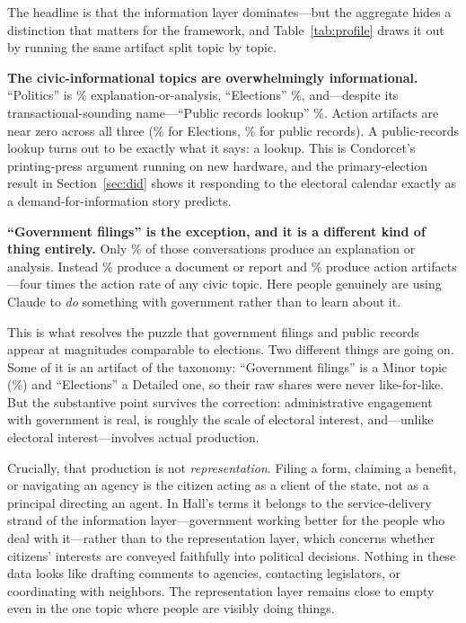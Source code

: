 \documentclass[11pt]{article}
\begin{document}
The headline is that the information layer dominates---but the aggregate hides
a distinction that matters for the framework, and Table~\ref{tab:profile} draws
it out by running the same artifact split topic by topic.

\begin{table}[h!]
\centering
\caption{Information, Action, and Document Artifacts by Topic (Global, May 2026)\label{tab:profile}}

\end{table}

\textbf{The civic-informational topics are overwhelmingly informational.}
``Politics'' is \polTopicInfo\% explanation-or-analysis, ``Elections''
\elInfo\%, and---despite its transactional-sounding name---``Public records
lookup'' \prInfo\%. Action artifacts are near zero across all three
(\elAction\% for Elections, \prAction\% for public records). A public-records
lookup turns out to be exactly what it says: a lookup. This is Condorcet's
printing-press argument running on new hardware, and the primary-election
result in Section~\ref{sec:did} shows it responding to the electoral calendar
exactly as a demand-for-information story predicts.

\textbf{``Government filings'' is the exception, and it is a different kind of
thing entirely.} Only \gfInfo\% of those conversations produce an explanation or
analysis. Instead \gfDoc\% produce a document or report and \gfAction\% produce
action artifacts---four times the action rate of any civic topic. Here people
genuinely are using Claude to \emph{do} something with government rather than to
learn about it.

This is what resolves the puzzle that government filings and public records
appear at magnitudes comparable to elections. Two different things are going on.
Some of it is an artifact of the taxonomy: ``Government filings'' is a Minor
topic (\gfShare\%) and ``Elections'' a Detailed one, so their raw shares were
never like-for-like. But the substantive point survives the correction:
administrative engagement with government is real, is roughly the scale of
electoral interest, and---unlike electoral interest---involves actual production.

Crucially, that production is not \emph{representation}. Filing a form, claiming
a benefit, or navigating an agency is the citizen acting as a client of the
state, not as a principal directing an agent. In Hall's terms it belongs to the
service-delivery strand of the information layer---government working better for
the people who deal with it---rather than to the representation layer, which
concerns whether citizens' interests are conveyed faithfully into political
decisions. Nothing in these data looks like drafting comments to agencies,
contacting legislators, or coordinating with neighbors. The representation layer
remains close to empty even in the one topic where people are visibly doing
things.
\end{document}
